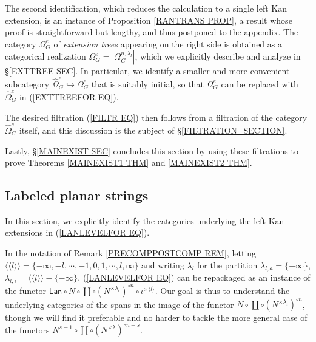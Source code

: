 \documentclass[a4paper,10pt]{article}%
\begin{document}
The second identification, 
which reduces the calculation to a single left Kan extension, is an instance of 
Proposition \ref{RANTRANS PROP}, 
a result whose proof is straightforward but lengthy, 
and thus postponed to the appendix.
The category $\Omega_G^e$ of \textit{extension trees}
appearing on the right side
is obtained as a categorical realization
$\Omega_G^e = |\Omega_{G}^{n,\lambda_l}|$,
which we explicitly describe and analyze in 
\S \ref{EXTTREE SEC}.
In particular, we identify a smaller and more convenient
subcategory 
$\widehat{\Omega}_G^e \hookrightarrow \Omega_G^e$
that is suitably initial,
so that $\Omega_G^e$ can be replaced with $\widehat{\Omega}_G^e$
in (\ref{EXTTREEFOR EQ}).

The desired filtration (\ref{FILTR EQ})
then follows from a filtration of the 
category $\widehat{\Omega}_G^e$ itself,
and this discussion is the subject of
\S \ref{FILTRATION_SECTION}.

Lastly, \S \ref{MAINEXIST SEC} concludes this section
by using these filtrations to prove 
Theorems \ref{MAINEXIST1 THM} and \ref{MAINEXIST2 THM}.



\subsection{Labeled planar strings}\label{LABELSTRI SEC}


In this section, we explicitly identify the categories underlying the left Kan extensions in (\ref{LANLEVELFOR EQ}).


In the notation 
of Remark \ref{PRECOMPPOSTCOMP REM},
letting 
$\langle \langle l 
\rangle \rangle = 
\{-\infty,-l,\cdots, -1, 0, 1, \cdots, l, \infty\}$ and writing
$\lambda_{l}$ for the partition
$\lambda_{l,a} = \{-\infty\}$,
$\lambda_{l,i} = 
\langle \langle l \rangle \rangle - \{-\infty\}$,
(\ref{LANLEVELFOR EQ})
can be repackaged as an instance of the functor
$\mathsf{Lan} \circ N \circ \coprod \circ (N^{\times \lambda_l})^{\circ n}\circ \iota^{\times \langle l \rangle}$.
Our goal is thus to understand 
the underlying categories of the spans in the image of the functor
$N \circ \coprod \circ (N^{\times \lambda_l})^{\circ n}$,
though we will find it preferable and no harder to tackle the more general case of the functors 
$N^{s+1} \circ \coprod \circ (N^{\times \lambda})^{\circ n-s}$.
\end{document}
